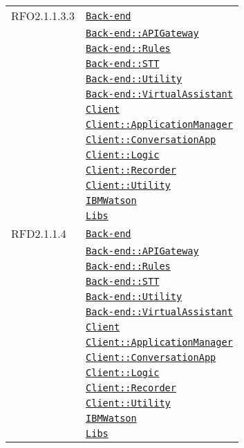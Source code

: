 \begin{longtable}{|>{\centering}m{3cm}|m{10cm}<{\centering}|}
RFO2.1.1.3.3 & \hyperref[Back-end]{\texttt{Back-end}}\\
& \hyperref[Back-end::APIGateway]{\texttt{Back-end::APIGateway}}\\
& \hyperref[Back-end::Rules]{\texttt{Back-end::Rules}}\\
& \hyperref[Back-end::STT]{\texttt{Back-end::STT}}\\
& \hyperref[Back-end::Utility]{\texttt{Back-end::Utility}}\\
& \hyperref[Back-end::VirtualAssistant]{\texttt{Back-end::VirtualAssistant}}\\
& \hyperref[Client]{\texttt{Client}}\\
& \hyperref[Client::ApplicationManager]{\texttt{Client::ApplicationManager}}\\
& \hyperref[Client::ConversationApp]{\texttt{Client::ConversationApp}}\\
& \hyperref[Client::Logic]{\texttt{Client::Logic}}\\
& \hyperref[Client::Recorder]{\texttt{Client::Recorder}}\\
& \hyperref[Client::Utility]{\texttt{Client::Utility}}\\
& \hyperref[IBMWatson]{\texttt{IBMWatson}}\\
& \hyperref[Libs]{\texttt{Libs}}\\ \hline

RFD2.1.1.4 & \hyperref[Back-end]{\texttt{Back-end}}\\
& \hyperref[Back-end::APIGateway]{\texttt{Back-end::APIGateway}}\\
& \hyperref[Back-end::Rules]{\texttt{Back-end::Rules}}\\
& \hyperref[Back-end::STT]{\texttt{Back-end::STT}}\\
& \hyperref[Back-end::Utility]{\texttt{Back-end::Utility}}\\
& \hyperref[Back-end::VirtualAssistant]{\texttt{Back-end::VirtualAssistant}}\\
& \hyperref[Client]{\texttt{Client}}\\
& \hyperref[Client::ApplicationManager]{\texttt{Client::ApplicationManager}}\\
& \hyperref[Client::ConversationApp]{\texttt{Client::ConversationApp}}\\
& \hyperref[Client::Logic]{\texttt{Client::Logic}}\\
& \hyperref[Client::Recorder]{\texttt{Client::Recorder}}\\
& \hyperref[Client::Utility]{\texttt{Client::Utility}}\\
& \hyperref[IBMWatson]{\texttt{IBMWatson}}\\
& \hyperref[Libs]{\texttt{Libs}}\\ \hline


\end{longtable}
